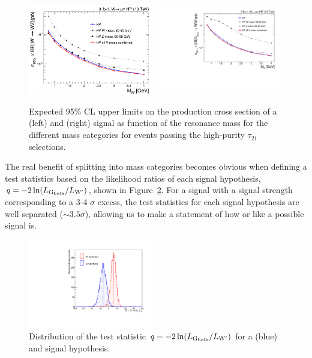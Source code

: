 \begin{figure}[htbp]
 \centering
 \includegraphics[width=0.49\textwidth]{figures/analysis/search1/AN-15-196/massCategories/compare-HP-HPV-Wprime.png}
  \includegraphics[width=0.49\textwidth]{figures/analysis/search1/AN-15-196/massCategories/compare-HP-HPV-BulkG.pdf}
 \caption{Expected 95\% CL upper limits on the production cross section of a \PWpr (left) and \BulkG (right) signal as function of the resonance mass for the different mass categories for events passing the high-purity $\tau_{21}$ selections.}
 \label{fig:searchI:massCategories}
 \end{figure}

The real benefit of splitting into mass categories becomes obvious when defining a test statistics based on the likelihood ratios of each signal hypothesis, $q = -2 \ln(L_{\mathrm{G}_\mathrm{bulk}}/L_{\mathrm{W}^\prime})$, shown in Figure~\ref{fig:searchI:signalsep}. For a signal with a signal strength corresponding to a 3-4 $\sigma$ excess, the test statistics for each signal hypothesis are well separated ($\sim3.5 \sigma$), allowing us to make a statement of how \BulkG or \PWpr like a possible signal is.

\begin{figure}[htbp]
 \centering
 \includegraphics[width=0.49\textwidth]{figures/analysis/search1/AN-15-196/massCategories/sig_sep.pdf}
 \caption{Distribution of the test statistic  $q = -2 \ln(L_{\mathrm{G}_\mathrm{bulk}}/L_{\mathrm{W}^\prime})$ for a \BulkG (blue) and \PWpr signal hypothesis.}
 \label{fig:searchI:signalsep}
 \end{figure}
 
